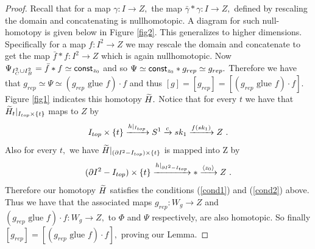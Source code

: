 \begin{proof}
 Recall that for a map $\gamma: I \rightarrow Z,$ the map $\bar{\gamma} \ast \gamma: I \rightarrow Z,$ defined by rescaling the domain and concatenating is nullhomotopic. A diagram for such null-homotopy is given below in Figure \ref{fig2}.
This generalizes to higher dimensions. Specifically for a map $f: I^{2} \rightarrow Z$ we may rescale the domain and concatenate to get the map $\bar{f} \ast f: I^{2} \rightarrow Z$ which is again nullhomotopic. Now $\Psi_{ I^{2}_{C} \cup I^{2}_{B}} = \bar{f} \ast f \simeq {\sf const}_{z_{0}}$ and so $\Psi \simeq {\sf const}_{z_{0}} \ast g_{rep} \simeq g_{rep}.$ Therefore we have that $g_{rep} \simeq \Psi \simeq (g_{rep} \text{ glue } f) \cdot f$ and thus $[g] = [g_{rep}] = [(g_{rep} \text{ glue } f) \cdot f].$  Figure \ref{fig1} indicates this homotopy $\widetilde{H}.$ 
Notice that for every $t$ we have that $\widetilde{H}_{t}|_{I_{top} \times \{t\}}$ maps to $Z$ by 
\[
I_{top} \times \{t\} \xrightarrow{h|_{I_{top}}} S^{1} \xrightarrow{c} sk_{1} \xrightarrow{f(sk_{1})} Z~.
\] Also for every $t,$ we have $\widetilde{H}|_{(\partial I^{2} - I_{top}) \times \{t\}}$ is mapped into Z by \[
(\partial I^{2} - I_{top}) \times \{t\} \xrightarrow{h|_{\partial I^{2} - I_{top}}} \ast \xrightarrow{\langle z_{0} \rangle} Z~.
\] 
Therefore our homotopy $\widetilde{H}$ satisfies the conditions (\ref{cond1}) and (\ref{cond2}) above. Thus we have that the associated maps $g_{rep} \colon W_{g} \rightarrow Z$ and $(g_{rep} \text{ glue } f) \cdot f\colon W_{g} \rightarrow Z,$ to $\Phi$ and $\Psi$ respectively, are also homotopic. So finally $[g_{rep}] = [(g_{rep} \text{ glue } f) \cdot f],$ proving our Lemma.
\end{proof}
